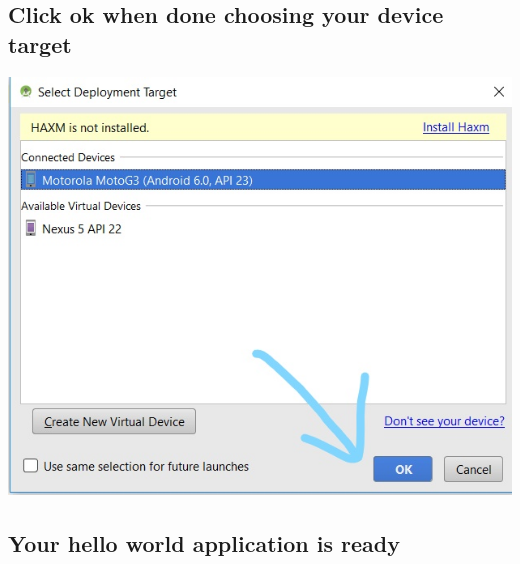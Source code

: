 \documentclass{article}
\begin{document}
\subsection{Click ok when done choosing your device target}

\includegraphics[width=\textwidth]{lab1-9}


\subsection{Your hello world application is ready}
\end{document}

